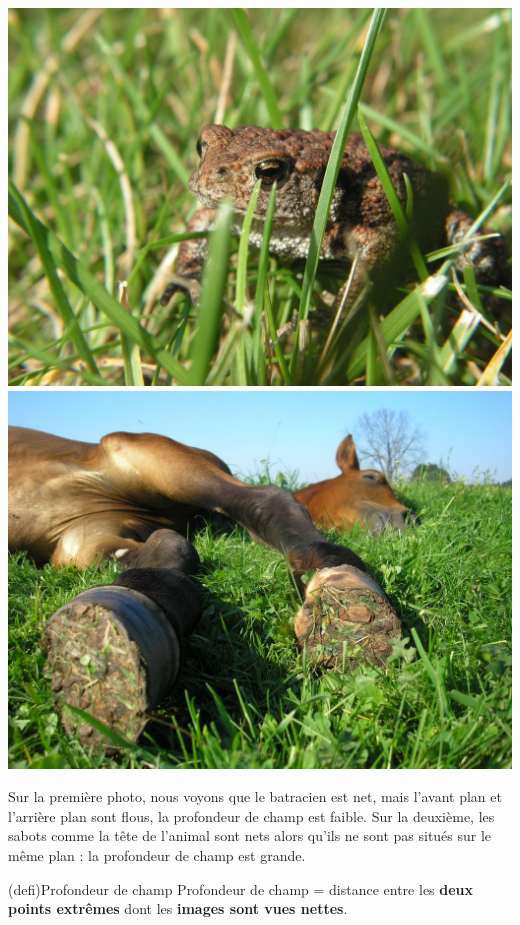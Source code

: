 \documentclass[../../main/main.tex]{subfiles}
\begin{document}
\begin{center}
	\includegraphics[scale=0.15]{photo-pdc-faible.jpg} \qquad
	\includegraphics[scale=0.15]{photo-pdc-eleve.jpg}
\end{center}

Sur la première photo, nous voyons que le batracien est net, mais l'avant plan
et l'arrière plan sont flous, la profondeur de champ est faible. Sur la
deuxième, les sabots comme la tête de l'animal sont nets alors qu'ils ne sont
pas situés sur le même plan : la profondeur de champ est grande.

\begin{tcb}[label=def:pdc](defi){Profondeur de champ}
	Profondeur de champ = distance entre les \textbf{deux points extrêmes} dont
	les \textbf{images sont vues nettes}.
\end{tcb}
\end{document}
